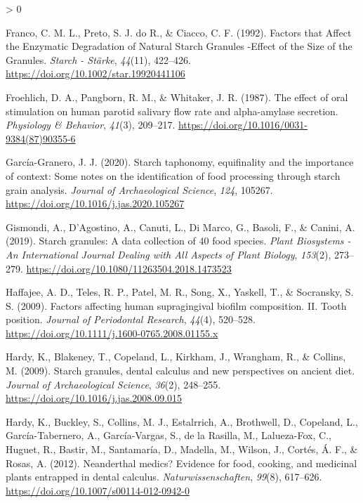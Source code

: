 \documentclass[
]{article}
\newlength{\cslhangindent}
\newenvironment{CSLReferences}[2] %
 {%
  \setlength{\parindent}{0pt}
  \ifodd #1 \everypar{\setlength{\hangindent}{\cslhangindent}}\ignorespaces\fi
  \ifnum #2 > 0
  \setlength{\parskip}{#2\baselineskip}
  \fi
 }%
 {}
\begin{document}
\begin{CSLReferences}{1}{0}
\leavevmode\hypertarget{ref-francoStarchDegradation1992}{}%
Franco, C. M. L., Preto, S. J. do R., \& Ciacco, C. F. (1992). Factors that {Affect} the {Enzymatic Degradation} of {Natural Starch Granules} -{Effect} of the {Size} of the {Granules}. \emph{Starch - Stärke}, \emph{44}(11), 422--426. \url{https://doi.org/10.1002/star.19920441106}

\leavevmode\hypertarget{ref-froehlichEffectOral1987}{}%
Froehlich, D. A., Pangborn, R. M., \& Whitaker, J. R. (1987). The effect of oral stimulation on human parotid salivary flow rate and alpha-amylase secretion. \emph{Physiology \& Behavior}, \emph{41}(3), 209--217. \url{https://doi.org/10.1016/0031-9384(87)90355-6}

\leavevmode\hypertarget{ref-graneroStarchTaphonomy2020}{}%
García-Granero, J. J. (2020). Starch taphonomy, equifinality and the importance of context: {Some} notes on the identification of food processing through starch grain analysis. \emph{Journal of Archaeological Science}, \emph{124}, 105267. \url{https://doi.org/10.1016/j.jas.2020.105267}

\leavevmode\hypertarget{ref-gismondiStarchGranulesData2019}{}%
Gismondi, A., D'Agostino, A., Canuti, L., Di Marco, G., Basoli, F., \& Canini, A. (2019). Starch granules: A data collection of 40 food species. \emph{Plant Biosystems - An International Journal Dealing with All Aspects of Plant Biology}, \emph{153}(2), 273--279. \url{https://doi.org/10.1080/11263504.2018.1473523}

\leavevmode\hypertarget{ref-haffajeeBiofilmPosition2009}{}%
Haffajee, A. D., Teles, R. P., Patel, M. R., Song, X., Yaskell, T., \& Socransky, S. S. (2009). Factors affecting human supragingival biofilm composition. {II}. {Tooth} position. \emph{Journal of Periodontal Research}, \emph{44}(4), 520--528. \url{https://doi.org/10.1111/j.1600-0765.2008.01155.x}

\leavevmode\hypertarget{ref-hardyStarchGranulesDental2009}{}%
Hardy, K., Blakeney, T., Copeland, L., Kirkham, J., Wrangham, R., \& Collins, M. (2009). Starch granules, dental calculus and new perspectives on ancient diet. \emph{Journal of Archaeological Science}, \emph{36}(2), 248--255. \url{https://doi.org/10.1016/j.jas.2008.09.015}

\leavevmode\hypertarget{ref-hardyNeanderthalMedics2012}{}%
Hardy, K., Buckley, S., Collins, M. J., Estalrrich, A., Brothwell, D., Copeland, L., García-Tabernero, A., García-Vargas, S., de la Rasilla, M., Lalueza-Fox, C., Huguet, R., Bastir, M., Santamaría, D., Madella, M., Wilson, J., Cortés, Á. F., \& Rosas, A. (2012). Neanderthal medics? {Evidence} for food, cooking, and medicinal plants entrapped in dental calculus. \emph{Naturwissenschaften}, \emph{99}(8), 617--626. \url{https://doi.org/10.1007/s00114-012-0942-0}


\end{CSLReferences}
\end{document}
